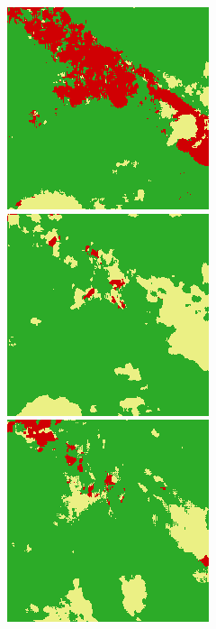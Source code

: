 \begin{figure}
    \includegraphics[width=\DensenetPredictionsImageWidth]{images/densenet/densenet-103/436897-prediction} \hfill
    \includegraphics[width=\DensenetPredictionsImageWidth]{images/densenet/densenet-67D/436897-prediction}
    \includegraphics[width=\DensenetPredictionsImageWidth]{images/densenet/densenet-56D/436897-prediction}


\end{figure}
